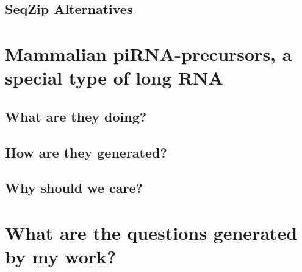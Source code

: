 \subsection{SeqZip Alternatives}
\section{Mammalian piRNA-precursors, a special type of long RNA}



\subsection{What are they doing?}


\subsection{How are they generated?}


\subsection{Why should we care?}

% 

\section{What are the questions generated by my work?}

